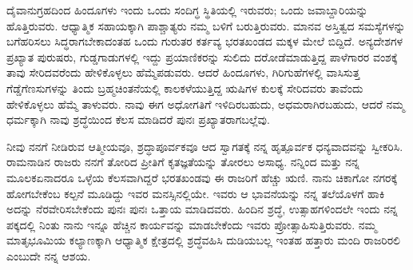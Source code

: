 ದೈವಾನುಗ್ರಹದಿಂದ ಹಿಂದೂಗಳು ಇಂದು ಒಂದು ಸಂದಿಗ್ಧ ಸ್ಥಿತಿಯಲ್ಲಿ ಇರುವರು; ಒಂದು ಜವಾಬ್ದಾರಿಯನ್ನು ಹೊತ್ತಿರುವರು. ಆಧ್ಯಾತ್ಮಿಕ ಸಹಾಯಕ್ಕಾಗಿ ಪಾಶ್ಚಾತ್ಯರು ನಮ್ಮ ಬಳಿಗೆ ಬರುತ್ತಿರುವರು. ಮಾನವ ಅಸ್ತಿತ್ವದ ಸಮಸ್ಯೆಗಳನ್ನು ಬಗೆಹರಿಸಲು ಸಿದ್ಧರಾಗಬೇಕಾದಂತಹ ಒಂದು ಗುರುತರ ಕರ್ತವ್ಯ ಭರತಖಂಡದ ಮಕ್ಕಳ ಮೇಲೆ ಬಿದ್ದಿದೆ. ಅನ್ಯದೇಶಗಳ ಪ್ರಖ್ಯಾತ ಪುರುಷರು, ಗುಡ್ಡಗಾಡುಗಳಲ್ಲಿ ಇದ್ದು ಪ್ರಯಾಣಿಕರನ್ನು ಸುಲಿದು ದರೋಡೆಮಾಡುತ್ತಿದ್ದ ಪಾಳೆಗಾರರ ವಂಶಕ್ಕೆ ತಾವು ಸೇರಿದವರೆಂದು ಹೇಳಿಕೊಳ್ಳಲು ಹೆಮ್ಮೆಪಡುವರು. ಆದರೆ ಹಿಂದೂಗಳು, ಗಿರಿಗುಹೆಗಳಲ್ಲಿ ವಾಸಿಸುತ್ತ ಗೆಡ್ಡೆಗೆಣಸುಗಳನ್ನು ತಿಂದು ಬ್ರಹ್ಮಚಿಂತನೆಯಲ್ಲಿ ಕಾಲಕಳೆಯುತ್ತಿದ್ದ ಋಷಿಗಳ ಕುಲಕ್ಕೆ ಸೇರಿದವರು ತಾವೆಂದು ಹೇಳಿಕೊಳ್ಳಲು ಹೆಮ್ಮೆ ತಾಳುವರು. ನಾವು ಈಗ ಅಧೋಗತಿಗೆ ಇಳಿದಿರಬಹುದು, ಅಧಮರಾಗಿರಬಹುದು, ಆದರೆ ನಮ್ಮ ಧರ್ಮಕ್ಕಾಗಿ ನಾವು ಶ್ರದ್ಧೆಯಿಂದ ಕೆಲಸ ಮಾಡಿದರೆ ಪುನಃ ಪ್ರಖ್ಯಾತರಾಗಬಲ್ಲೆವು. 

ನೀವು ನನಗೆ ನೀಡಿರುವ ಆತ್ಮೀಯವೂ, ಶ್ರದ್ಧಾಪೂರ್ವಕವೂ ಆದ ಸ್ವಾಗತಕ್ಕೆ ನನ್ನ ಹೃತ್ಪೂರ್ವಕ ಧನ್ಯವಾದವನ್ನು ಸ್ವೀಕರಿಸಿ. ರಾಮನಾಡಿನ ರಾಜರು ನನಗೆ ತೋರಿದ ಪ್ರೀತಿಗೆ ಕೃತಜ್ಞತೆಯನ್ನು ತೋರಲು ಅಸಾಧ್ಯ. ನನ್ನಿಂದ ಮತ್ತು ನನ್ನ ಮೂಲಕ\break ಏನಾದರೂ ಒಳ್ಳೆಯ ಕೆಲಸವಾಗಿದ್ದರೆ ಭರತಖಂಡವು ಈ ರಾಜರಿಗೆ ಹೆಚ್ಚು ಋಣಿ. ನಾನು ಚಿಕಾಗೋ ನಗರಕ್ಕೆ ಹೋಗಬೇಕೆಂಬ ಕಲ್ಪನೆ ಮೂಡಿದ್ದು ಇವರ ಮನಸ್ಸಿನಲ್ಲಿಯೇ. ಇವರು ಆ ಭಾವನೆಯನ್ನು ನನ್ನ ತಲೆಯೊಳಗೆ ಹಾಕಿ ಅದನ್ನು ನೆರವೇರಿಸಬೇಕೆಂದು ಪುನಃ ಪುನಃ ಒತ್ತಾಯ ಮಾಡಿದವರು. ಹಿಂದಿನ ಶ್ರದ್ಧೆ, ಉತ್ಸಾಹಗಳಿಂದಲೇ ಇಂದು ನನ್ನ ಪಕ್ಕದಲ್ಲಿ ನಿಂತು ನಾನು ಇನ್ನೂ ಹೆಚ್ಚಿನ ಕಾರ್ಯವನ್ನು ಮಾಡಬೇಕೆಂದು ಇವರು ಪ್ರೋತ್ಸಾಹಿಸುತ್ತಿರುವರು. ನಮ್ಮ ಮಾತೃಭೂಮಿಯ ಕಲ್ಯಾಣಕ್ಕಾಗಿ ಆಧ್ಯಾತ್ಮಿಕ ಕ್ಷೇತ್ರದಲ್ಲಿ ಶ್ರದ್ಧೆವಹಿಸಿ ದುಡಿಯಬಲ್ಲ ಇಂತಹ ಹತ್ತಾರು ಮಂದಿ ರಾಜರಿರಲಿ ಎಂಬುದೇ ನನ್ನ ಆಶಯ. 

